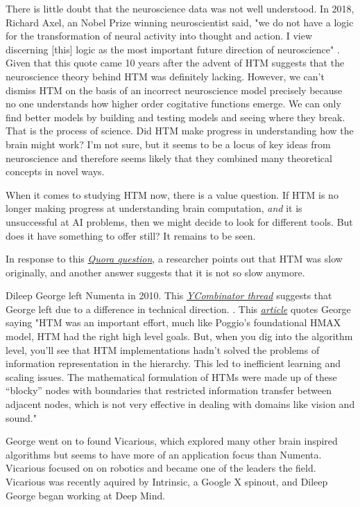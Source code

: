 \documentclass{article}
\begin{document}
 There is little doubt that the neuroscience data was not well understood. In 2018, Richard Axel, an Nobel Prize winning neuroscientist said, "we do not have a logic for the transformation of neural activity into thought and action. I view discerning [this] logic as the most important future direction of neuroscience" \cite{Axel2018}. Given that this quote came 10 years after the advent of HTM suggests that the neuroscience theory behind HTM was definitely lacking. However, we can't dismiss HTM on the basis of an incorrect neuroscience model precisely because no one understands how higher order cogitative functions emerge. We can only find better models by building and testing models and seeing where they break. That is the process of science. Did HTM make progress in understanding how the brain might work? I'm not sure, but it seems to be a locus of key ideas from neuroscience and therefore seems likely that they combined many theoretical concepts in novel ways. 

When it comes to studying HTM now, there is a value question. If HTM is no longer making progress at understanding brain computation, \textit{and} it is unsuccessful at AI problems, then we might decide to look for different tools. But does it have something to offer still? It remains to be seen.



In response to this \textit{\href{https://qr.ae/pvFs4y}{Quora question}}, a researcher points out that HTM was slow originally, and another answer suggests that it is not so slow anymore.


Dileep George left Numenta in 2010. This \textit{\href{https://news.ycombinator.com/item?id=7443016}{YCombinator thread}} suggests that George left due to a difference in technical direction. 
. This \href{https://www.kurzweilai.net/vicarious-announces-15-million-funding-for-ai-software-based-on-the-brain}{\textit{article}} quotes George saying "HTM was an important effort, much like Poggio’s foundational HMAX model, HTM had the right high level goals. But, when you dig into the algorithm level, you’ll see that HTM implementations hadn’t solved the problems of information representation in the hierarchy. This led to inefficient learning and scaling issues.  The mathematical formulation of HTMs were made up of these “blocky” nodes with boundaries that restricted information transfer between adjacent nodes, which is not very effective in dealing with domains like vision and sound."

George went on to found Vicarious, which explored many other brain inspired algorithms but seems to have more of an application focus than Numenta. Vicarious focused on on robotics and became one of the leaders the field. Vicarious was recently aquired by Intrinsic, a Google X spinout, and Dileep George began working at Deep Mind. 
\end{document}

